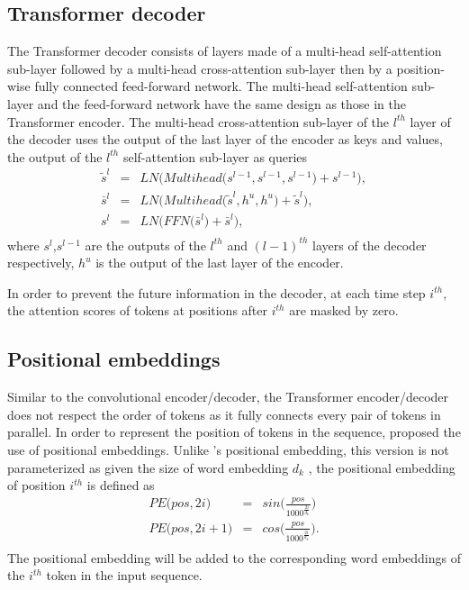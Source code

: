 \subsection{Transformer decoder}
The Transformer decoder consists of layers made of a multi-head self-attention sub-layer followed by a multi-head cross-attention sub-layer then by a position-wise fully connected feed-forward network. The multi-head self-attention sub-layer and the feed-forward network have the same design as those in the Transformer encoder. The multi-head cross-attention sub-layer of the $l^{th}$ layer of the decoder uses the output of the last layer of the encoder as keys and values, the output of the $l^{th}$ self-attention sub-layer as queries
\begin{equation}
\begin{array}{rcl}
\tilde{s}^l &=& LN\bigg( Multihead\big( s^{l-1},s^{l-1},s^{l-1} \big) + s^{l-1} \bigg), \\
\bar{s}^l &=& LN\bigg( Multihead\big( \tilde{s}^l, h^u, h^u \big) + \tilde{s}^l \bigg), \\
s^l &=& LN\bigg( FFN\big( \bar{s}^l \big) + \bar{s}^l \bigg), \\
\end{array}
\end{equation}
where $s^l$,$s^{l-1}$ are the outputs of the $l^{th}$ and $(l-1)^{th}$ layers of the decoder respectively, $h^u$ is the output of the last layer of the encoder.

In order to prevent the future information in the decoder, at each time step $i^{th}$, the attention scores of tokens at positions after $i^{th}$ are masked by zero.

\subsection{Positional embeddings}
Similar to the convolutional encoder/decoder, the Transformer encoder/decoder does not respect the order of tokens as it fully connects every pair of tokens in parallel. In order to represent the position of tokens in the sequence, \citet{Vaswani17attention} proposed the use of positional embeddings. Unlike \citet{Ghering17convolutional}'s positional embedding, this version is not parameterized as given the size of word embedding $d_k$ , the positional embedding of position $i^{th}$ is defined as 
\begin{equation}
\begin{array}{rcl}
PE\big(pos,2i\big) &=& sin \big( \frac{pos}{1000^{\frac{2i}{d_k}}} \big)\\
PE\big(pos,2i+1\big) &=& cos \big( \frac{pos}{1000^{\frac{2i}{d_k}}} \big).\\
\end{array}
\end{equation}
The positional embedding will be added to the corresponding word embeddings of the $i^{th}$ token in the input sequence.
